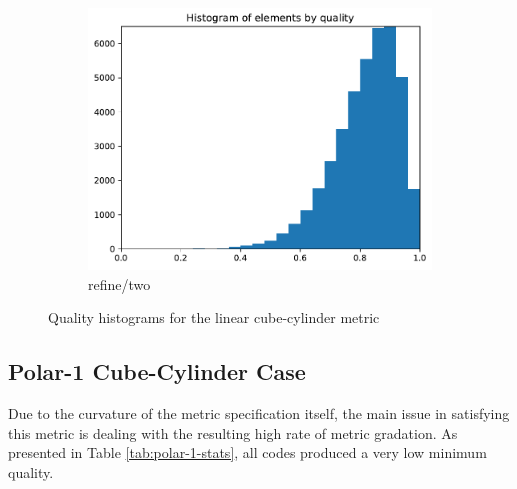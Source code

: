 \documentclass[3p,times,procedia,number]{elsarticle}
\begin{document}
\begin{figure}
\begin{subfigure}{.16\textwidth}
\includegraphics[width=\textwidth]{refine-two-cube-cylinder-linear-quality.pdf}
\caption{refine/two}
\end{subfigure}
\caption{Quality histograms for the linear cube-cylinder metric}
\label{fig:cube-cylinder-linear-qualities}
\end{figure}

\subsection{Polar-1 Cube-Cylinder Case}
\label{sec:cube-cylinder-polar-1}

Due to the curvature of the metric specification itself,
the main issue in satisfying this metric is dealing with the
resulting high rate of metric gradation.
As presented in Table \ref{tab:polar-1-stats}, all codes produced
a very low minimum quality.
\end{document}
